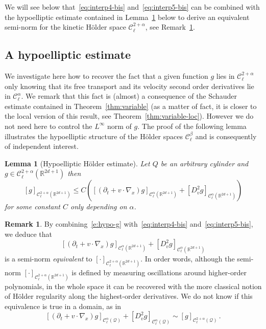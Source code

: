 \documentclass[10pt]{amsart}
\newtheorem{lemm}[theo]{Lemma}\newtheorem{prop}[theo]{Proposition}\newtheorem{coro}[theo]{Corollary}\newtheorem{conj}[theo]{Conjecture}
\theoremstyle{definition}\newtheorem{defi}[theo]{Definition}\newtheorem{rema}[theo]{Remark}\newtheorem{exam}[theo]{Example}\newtheorem{exem}[theo]{Example}\newtheorem{nota}[theo]{Notation}
\newcommand{\R}{\mathbb{R}}
\newcommand{\cC}{\mathcal{C}}
\newcommand{\cQ}{\mathcal{Q}}
\begin{document}
We will see below that~\eqref{eq:interp4-bis} and~\eqref{eq:interp5-bis} can be combined with the hypoelliptic estimate contained in Lemma~\ref{l:hypo} below to derive an equivalent semi-norm for the kinetic H\"older space $\cC_\ell^{2+\alpha}$, see Remark~\ref{rem:equiv}.

\subsection{A hypoelliptic estimate}

We investigate here how to recover the fact that a given function $g$ lies in $\cC^{2+\alpha}_\ell$ only knowing that its free transport and its velocity second order derivatives lie in $\cC_\ell^\alpha$. We remark that this fact is (almost) a consequence of the Schauder estimate contained in Theorem~\ref{thm:variable} (as a matter of fact, it is closer to the local version of this result, see Theorem~\ref{thm:variable-loc}). However we do not need here to control the $L^\infty$ norm of $g$. The proof of the following lemma illustrates the hypoelliptic structure of the H\"older spaces $\cC_\ell^\beta$ and is consequently of independent interest.


\begin{lemm}[Hypoelliptic H\"older estimate]\label{l:hypo}
Let $Q$ be an arbitrary cylinder and $g \in \cC_\ell^{2+\alpha} (\R^{2d+1})$ then
\begin{equation}\label{e:hypo-g}
[g]_{\cC_\ell^{2+\alpha}\left(\R^{2d+1}\right)} \le C \left(\left[\left(\partial_t + v \cdot \nabla_x\right) g\right]_{\cC_\ell^{\alpha}\left(\R^{2d+1}\right)}+ \left[D^2_v g\right]_{\cC_\ell^{\alpha}\left(\R^{2d+1}\right)}\right)
\end{equation}
for some constant $C$ only depending on $\alpha$.
\end{lemm}

\begin{rema}\label{rem:equiv}
By combining~\eqref{e:hypo-g} with~\eqref{eq:interp4-bis} and~\eqref{eq:interp5-bis}, we deduce that
\[
\left[\left(\partial_t + v \cdot \nabla_x\right) g\right]_{\cC_\ell^{\alpha}\left(\R^{2d+1}\right)} + \left[D^2_v g\right]_{\cC_\ell^{\alpha}\left(\R^{2d+1}\right)}
\]
is a semi-norm \emph{equivalent} to $[\cdot]_{\cC_\ell^{2+\alpha}(\R^{2d+1})}$. In order words, although the semi-norm $[\cdot]_{\cC_\ell^{2+\alpha}(\R^{2d+1})}$ is defined by measuring oscillations around higher-order polynomials, in the whole space it can be recovered with the more classical notion of H\"older regularity along the highest-order derivatives. We do not know if this equivalence is true in a domain, as in
\[
\left[\left(\partial_t + v \cdot \nabla_x\right) g\right]_{\cC_\ell^{\alpha}(\cQ)} + \left[D^2_v g\right]_{\cC_\ell ^\alpha (\cQ)} \sim [g]_{\cC_\ell^{2+\alpha}(\cQ)}\,.
\]
\end{rema}
\end{document}
